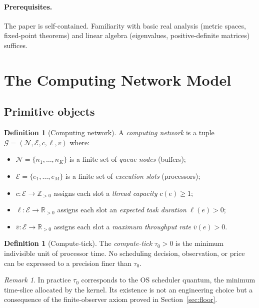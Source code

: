\documentclass[11pt,twocolumn,a4paper]{article}
\theoremstyle{plain}
\theoremstyle{definition}
\newtheorem{definition}[theorem]{Definition}
\theoremstyle{remark}
\newtheorem{remark}[theorem]{Remark}
\newcommand{\N}{\mathcal{N}}
\newcommand{\E}{\mathcal{E}}
\newcommand{\G}{\mathcal{G}}
\newcommand{\R}{\mathbb{R}}
\newcommand{\tick}{\tau_0}
\begin{document}
\paragraph{Prerequisites.} The paper is self-contained. Familiarity with basic real analysis (metric spaces, fixed-point theorems) and linear algebra (eigenvalues, positive-definite matrices) suffices.

\section{The Computing Network Model}
\label{sec:model}

\subsection{Primitive objects}

\begin{definition}[Computing network]
\label{def:network}
A \emph{computing network} is a tuple $\G = (\N, \E, c, \ell, \bar{v})$ where:
\begin{itemize}[nosep]
\item $\N = \{n_1, \ldots, n_K\}$ is a finite set of \emph{queue nodes} (buffers);
\item $\E = \{e_1, \ldots, e_M\}$ is a finite set of \emph{execution slots} (processors);
\item $c : \E \to \mathbb{Z}_{>0}$ assigns each slot a \emph{thread capacity} $c(e) \geq 1$;
\item $\ell : \E \to \R_{>0}$ assigns each slot an \emph{expected task duration} $\ell(e) > 0$;
\item $\bar{v} : \E \to \R_{>0}$ assigns each slot a \emph{maximum throughput rate} $\bar{v}(e) > 0$.
\end{itemize}
\end{definition}

\begin{definition}[Compute-tick]
\label{def:tick}
The \emph{compute-tick} $\tick > 0$ is the minimum indivisible unit of processor time. No scheduling decision, observation, or price can be expressed to a precision finer than $\tick$.
\end{definition}

\begin{remark}
In practice $\tick$ corresponds to the OS scheduler quantum, the minimum time-slice allocated by the kernel. Its existence is not an engineering choice but a consequence of the finite-observer axiom proved in Section~\ref{sec:floor}.
\end{remark}
\end{document}
